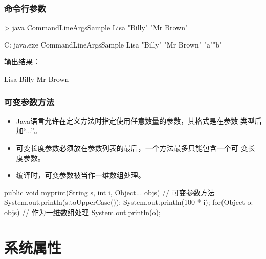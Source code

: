 \begin{frame}[fragile] %
  \frametitle{命令行参数}


  \pause


  \begin{shCode}
    > java CommandLineArgsSample Lisa "Billy" "Mr Brown"
  \end{shCode}

  \pause


  \begin{shCode}
    C:\> java.exe CommandLineArgsSample Lisa "Billy" "Mr Brown" "a""b" 
  \end{shCode}

  \pause

  输出结果：

  \begin{stdoutCode}
    Lisa
    Billy
    Mr Brown
  \end{stdoutCode}
\end{frame}

\begin{frame}[fragile] %
  \frametitle{可变参数方法}

  \begin{itemize}
  \item Java语言允许在定义方法时指定使用任意数量的参数，其格式是在参数
    类型后加“...”。
  \item 可变长度参数必须放在参数列表的最后，一个方法最多只能包含一个可
    变长度参数。
  \item 编译时，可变参数被当作{\Red\hei 一维数组处理}。
  \end{itemize}

  \begin{javaCode}
    public void myprint(String s, int i, Object... objs) { // 可变参数方法
      System.out.println(s.toUpperCase()); 
      System.out.println(100 * i);
      for(Object o: objs) { // 作为一维数组处理
        System.out.println(o); 
      }
    } 
  \end{javaCode}
\end{frame}

\section{系统属性}

